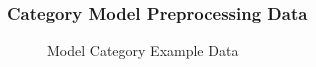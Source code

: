 \documentclass[12pt,oneside,openright,a4paper]{cpe-english-project}
\begin{document}
\subsubsection{Category Model Preprocessing Data}
\begin{figure}[!h]\centering
{}
\caption{Model Category Example Data}\label{fig:Model Category Example Data}
\end{figure}
\pagebreak
\end{document}
